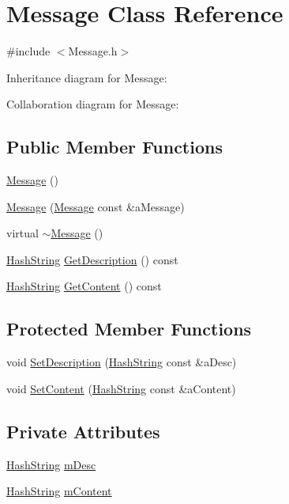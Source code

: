 \hypertarget{classMessage}{}\section{Message Class Reference}
\label{classMessage}


{\ttfamily \#include $<$Message.\+h$>$}



Inheritance diagram for Message\+:


Collaboration diagram for Message\+:
\subsection*{Public Member Functions}
\begin{DoxyCompactItemize}
\item 
\hyperlink{classMessage_a4fc4f717b634e66070366cb7722d7761}{Message} ()
\item 
\hyperlink{classMessage_a2cfab6a3f707218d385749a1c4b0ffad}{Message} (\hyperlink{classMessage}{Message} const \&a\+Message)
\item 
virtual \hyperlink{classMessage_acee46f6aed7e93e244460565079a5c48}{$\sim$\+Message} ()
\item 
\hyperlink{classHashString}{Hash\+String} \hyperlink{classMessage_ac82632a598bafdb705f40bbf8258662a}{Get\+Description} () const 
\item 
\hyperlink{classHashString}{Hash\+String} \hyperlink{classMessage_a32cda528eb220a60e4bca0e569d71ebf}{Get\+Content} () const 
\end{DoxyCompactItemize}
\subsection*{Protected Member Functions}
\begin{DoxyCompactItemize}
\item 
void \hyperlink{classMessage_a1fcd8cf942a5c352f77dbe8334588b1b}{Set\+Description} (\hyperlink{classHashString}{Hash\+String} const \&a\+Desc)
\item 
void \hyperlink{classMessage_aa053a5b0e865288e24356999b998b27a}{Set\+Content} (\hyperlink{classHashString}{Hash\+String} const \&a\+Content)
\end{DoxyCompactItemize}
\subsection*{Private Attributes}
\begin{DoxyCompactItemize}
\item 
\hyperlink{classHashString}{Hash\+String} \hyperlink{classMessage_af468496867cb091479ca34266e77ffa5}{m\+Desc}
\item 
\hyperlink{classHashString}{Hash\+String} \hyperlink{classMessage_a2186c08dfc88dd436d0df1018f5765e6}{m\+Content}
\end{DoxyCompactItemize}



